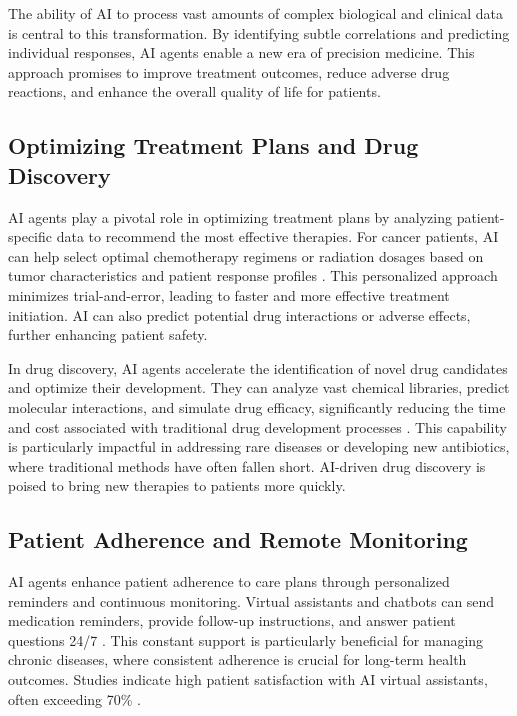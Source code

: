 \documentclass[12pt,a4paper]{article}
\begin{document}
The ability of AI to process vast amounts of complex biological and clinical data is central to this transformation. By identifying subtle correlations and predicting individual responses, AI agents enable a new era of precision medicine. This approach promises to improve treatment outcomes, reduce adverse drug reactions, and enhance the overall quality of life for patients.

\subsection{Optimizing Treatment Plans and Drug Discovery}
\label{subsec:treatment-drug-discovery}
AI agents play a pivotal role in optimizing treatment plans by analyzing patient-specific data to recommend the most effective therapies. For cancer patients, AI can help select optimal chemotherapy regimens or radiation dosages based on tumor characteristics and patient response profiles \cite{wang2019deep}. This personalized approach minimizes trial-and-error, leading to faster and more effective treatment initiation. AI can also predict potential drug interactions or adverse effects, further enhancing patient safety.

In drug discovery, AI agents accelerate the identification of novel drug candidates and optimize their development. They can analyze vast chemical libraries, predict molecular interactions, and simulate drug efficacy, significantly reducing the time and cost associated with traditional drug development processes \cite{fleming2018artificial}. This capability is particularly impactful in addressing rare diseases or developing new antibiotics, where traditional methods have often fallen short. AI-driven drug discovery is poised to bring new therapies to patients more quickly.

\subsection{Patient Adherence and Remote Monitoring}
\label{subsec:patient-adherence}
AI agents enhance patient adherence to care plans through personalized reminders and continuous monitoring. Virtual assistants and chatbots can send medication reminders, provide follow-up instructions, and answer patient questions 24/7 \cite{oracle_cloud}. This constant support is particularly beneficial for managing chronic diseases, where consistent adherence is crucial for long-term health outcomes. Studies indicate high patient satisfaction with AI virtual assistants, often exceeding 70\% \cite{oracle_cloud}.
\end{document}
